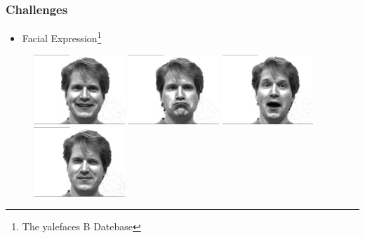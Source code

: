 \documentclass[10pt]{beamer}
\begin{document}
\begin{frame}
    \frametitle{Challenges}
   \begin{itemize}
   \item Facial Expression\footnote{The yalefaces B Datebase}
   \end{itemize}
     \begin{figure}
     \begin{minipage}[t]{0.35\linewidth} 
     \centering 
     \includegraphics[width=1.35in]{happy.jpg} 
   \end{minipage}
   \begin{minipage}[t]{0.35\linewidth} 
     \centering 
     \includegraphics[width=1.35in]{sad.jpg} 
   \end{minipage} 
   \begin{minipage}[b]{0.35\linewidth} 
     \centering 
     \includegraphics[width=1.35in]{surprise.jpg} 
   \end{minipage}
   \begin{minipage}[b]{0.35\linewidth} 
     \centering 
     \includegraphics[width=1.35in]{wink.jpg} 
   \end{minipage}
   \end{figure}
\end{frame}
\end{document}
